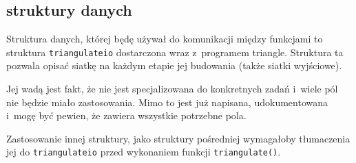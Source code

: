 \documentclass[a4paper]{article}
\begin{document}
\subsection{struktury danych}
Struktura danych, której będę używał do komunikacji między funkcjami to struktura \texttt{triangulateio} dostarczona wraz z~programem triangle.
Struktura ta pozwala opisać siatkę na każdym etapie jej budowania (także siatki wyjściowe).

Jej wadą jest fakt, że nie jest specjalizowana do konkretnych zadań i~wiele pól nie będzie miało zastosowania.
Mimo to jest już napisana, udokumentowana i~mogę być pewien, że zawiera wszystkie potrzebne pola.

Zastosowanie innej struktury, jako struktury pośredniej wymagałoby tłumaczenia jej do \texttt{triangulateio} przed wykonaniem funkcji \texttt{triangulate()}.
\end{document}
